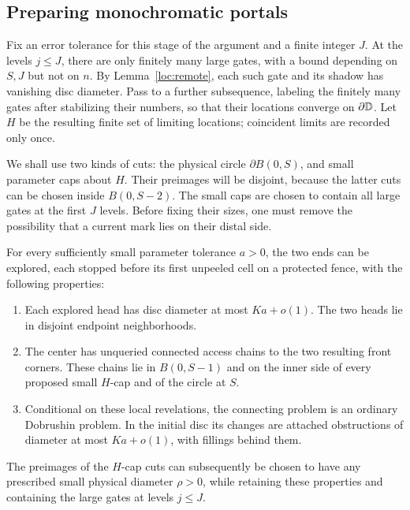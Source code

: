\subsection{Preparing monochromatic portals}

Fix an error tolerance for this stage of the argument and a finite
integer \(J\). At the levels \(j\le J\), there are only finitely
many large gates, with a bound depending on \(S,J\) but not on
\(n\). By Lemma~\ref{loc:remote}, each such gate and its shadow
has vanishing disc diameter. Pass to a further subsequence,
labeling the finitely many gates after stabilizing their numbers,
so that their locations converge on \(\partial\mathbb D\).
Let \(H\) be the resulting finite set of limiting locations;
coincident limits are recorded only once.

We shall use two kinds of cuts: the physical circle
\(\partial B(0,S)\), and small parameter caps about \(H\).
Their preimages will be disjoint, because the latter cuts can be
chosen inside \(B(0,S-2)\). The small caps are chosen to contain
all large gates at the first \(J\) levels. Before fixing their
sizes, one must remove the possibility that a current mark lies
on their distal side.

\begin{lemma}
\label{loc:heads}
For every sufficiently small parameter tolerance \(a>0\),
the two ends can be explored, each stopped before its first
unpeeled cell on a protected fence, with the following
properties:
\begin{enumerate}
\item Each explored head has disc diameter at most \(Ka+o(1)\).
The two heads lie in disjoint endpoint neighborhoods.
\item The center has unqueried connected access chains to the
two resulting front corners. These chains lie in
\(B(0,S-1)\) and on the inner side of every proposed
small \(H\)-cap and of the circle at \(S\).
\item Conditional on these local revelations, the connecting
problem is an ordinary Dobrushin problem. In the initial
disc its changes are attached obstructions of diameter
at most \(Ka+o(1)\), with fillings behind them.
\end{enumerate}
The preimages of the \(H\)-cap cuts can subsequently be
chosen to have any prescribed small physical diameter
\(\rho>0\), while retaining these properties and containing
the large gates at levels \(j\le J\).
\end{lemma}

